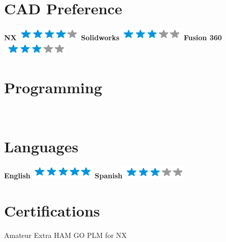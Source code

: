 \documentclass[]{friggeri-cv}
\begin{document}
\begin{aside}
    \section{CAD Preference}
    \textbf{NX}\includegraphics[scale=0.40]{img/4stars.png}
    \textbf{Solidworks}\includegraphics[scale=0.40]{img/3stars.png}
    \textbf{Fusion 360}\includegraphics[scale=0.40]{img/3stars.png}
    ~
    \section{Programming}
    ~
    \section{Languages}
    \textbf{English}\includegraphics[scale=0.40]{img/5stars.png}
    \textbf{Spanish}\includegraphics[scale=0.40]{img/3stars.png}
    ~
    \section{Certifications}
    Amateur Extra HAM
    GO PLM for NX
    ~
\end{aside}
\end{document}

